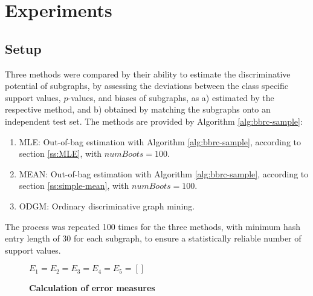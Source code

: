 \documentclass{sig-alternate}
\begin{document}
\section{Experiments}
\label{s:Experiments}

\subsection{Setup} 
\label{ss:Error-estimation} 
Three methods were compared by their ability to estimate the discriminative
potential of subgraphs, by assessing the deviations between the class specific
support values, $p$-values, and biases of subgraphs, as a) estimated by the respective
method, and b) obtained by matching the subgraphs onto an independent test set.
The methods are provided by Algorithm \ref{alg:bbrc-sample}:
\begin{enumerate} 
  \item MLE: Out-of-bag estimation with Algorithm \ref{alg:bbrc-sample}, according
    to section \ref{ss:MLE}, with $numBoots=100$.
  \item MEAN: Out-of-bag estimation with Algorithm \ref{alg:bbrc-sample}, according
    to section \ref{ss:simple-mean}, with $numBoots=100$.
  \item ODGM: Ordinary discriminative graph mining.
\end{enumerate}

The process was repeated 100 times for the three methods, with minimum hash entry length 
of 30 for each subgraph, to ensure a statistically reliable number of support values. 

\begin{figure*}[t]
  \begin{minipage}[h]{.59\textwidth}
    \begin{algorithm2e}[H]
      \fontsize{8}{10}
      \selectfont
      $E_1 =  E_2 =  E_3 =  E_4 =  E_5 =  \left[ \right]$\;
      \caption{\textbf{Calculation of error measures}\label{alg:pValEstimate}}
    \end{algorithm2e}
  \end{minipage}
  \begin{minipage}[h]{.39\textwidth}
    
  \end{minipage}
\end{figure*}
\end{document}
